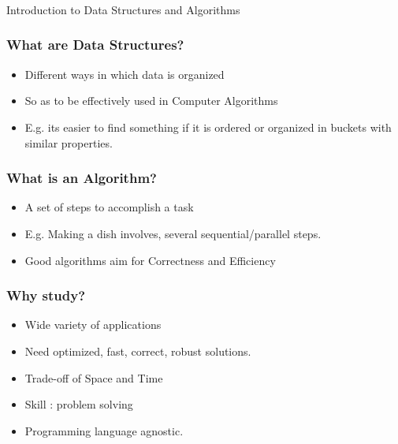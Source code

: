 \begin{frame}[fragile]\frametitle{}
\begin{center}
{\Large Introduction to Data Structures and Algorithms}
\end{center}

\end{frame}

\begin{frame}
	\frametitle{What are Data Structures?}
		\begin{itemize}
			\item Different ways in which data is organized
			\item So as to be effectively used in Computer Algorithms
			\item E.g. its easier to find something if it is ordered or organized in buckets with similar properties.
		\end{itemize}
\end{frame}

\begin{frame}
	\frametitle{What is an Algorithm?}
		\begin{itemize}
			\item A set of steps to accomplish a task
			\item E.g. Making a dish involves, several sequential/parallel steps.
			\item Good algorithms aim for Correctness and Efficiency
		\end{itemize}
\end{frame}

\begin{frame}
	\frametitle{Why study?}
		\begin{itemize}
			\item Wide variety of applications
			\item Need optimized, fast, correct, robust solutions.
			\item Trade-off of Space and Time
			\item Skill : problem solving
			\item Programming language agnostic.
		\end{itemize}
\end{frame}

